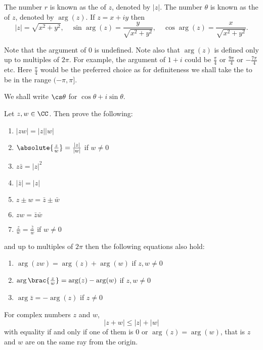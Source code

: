 \begin{definition}
The number $r$ is known as the  of $z$, denoted by $|z|$. The number $\theta$ is known as the  of $z$, denoted by $\arg(z)$. If $z=x+iy$ then
\[ |z|=\sqrt{x^2+y^2}, \quad \sin\arg(z)=\frac{y}{\sqrt{x^2+y^2}}, \quad \cos\arg(z)=\frac{x}{\sqrt{x^2+y^2}}. \]
\end{definition}

Note that the argument of $0$ is undefined. Note also that $\arg(z)$ is defined only up to multiples of $2\pi$. For example, the argument of $1+i$ could be $\frac{\pi}{4}$ or $\frac{9\pi}{4}$ or $-\frac{7\pi}{4}$ etc. Here $\frac{\pi}{4}$ would be the preferred choice as for definiteness we shall take the  to be in the range $(-\pi,\pi]$.

\begin{notation}
We shall write $\cs\theta$ for $\cos\theta+i\sin\theta$.
\end{notation}

\begin{exercise}{}{}
Let $z,w \in \CC$. Then prove the following:
\begin{enumerate}[label=(\alph*)]
\item $|zw|=|z||w|$
\item $\absolute{\frac{z}{w}}=\frac{|z|}{|w|}$ if $w\neq0$
\item $z\bar{z}=|z|^2$
\item $|\bar{z}|=|z|$
\item $z\pm w=\bar{z}\pm\bar{w}$
\item $zw=\bar{z}\bar{w}$
\item $\frac{z}{w}=\frac{\bar{z}}{\bar{w}}$ if $w\neq0$
\end{enumerate}
and up to multiples of $2\pi$ then the following equations also hold:
\begin{enumerate}[resume*]
\item $\arg(zw)=\arg(z)+\arg(w)$ if $z,w\neq0$
\item $\arg\brac{\frac{z}{w}}=\arg(z)-\arg(w)$ if $z,w\neq0$
\item $\arg\bar{z}=-\arg(z)$ if $z\neq0$
\end{enumerate}
\end{exercise}

\begin{theorem}
For complex numbers $z$ and $w$,
\[ |z+w|\le|z|+|w| \]
with equality if and only if one of them is $0$ or $\arg(z)=\arg(w)$, that is $z$ and $w$ are on the same ray from the origin.
\end{theorem}

